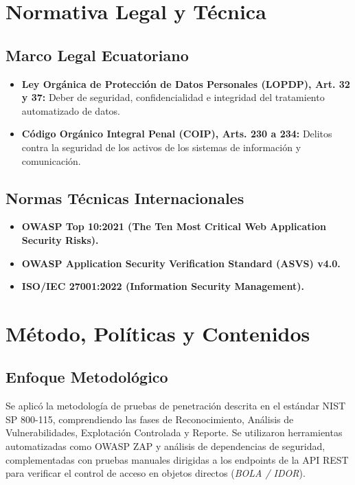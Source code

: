 \documentclass[12pt,a4paper]{article}
\begin{document}
\section{Normativa Legal y Técnica}
\subsection{Marco Legal Ecuatoriano}
\begin{itemize}[leftmargin=1.5em, itemsep=2pt]
    \item \textbf{Ley Orgánica de Protección de Datos Personales (LOPDP), Art. 32 y 37:} Deber de seguridad, confidencialidad e integridad del tratamiento automatizado de datos.
    \item \textbf{Código Orgánico Integral Penal (COIP), Arts. 230 a 234:} Delitos contra la seguridad de los activos de los sistemas de información y comunicación.
\end{itemize}
\subsection{Normas Técnicas Internacionales}
\begin{itemize}[leftmargin=1.5em, itemsep=2pt]
    \item \textbf{OWASP Top 10:2021 (The Ten Most Critical Web Application Security Risks).}
    \item \textbf{OWASP Application Security Verification Standard (ASVS) v4.0.}
    \item \textbf{ISO/IEC 27001:2022 (Information Security Management).}
\end{itemize}

\section{Método, Políticas y Contenidos}
\subsection{Enfoque Metodológico}
Se aplicó la metodología de pruebas de penetración descrita en el estándar NIST SP 800-115, comprendiendo las fases de Reconocimiento, Análisis de Vulnerabilidades, Explotación Controlada y Reporte. Se utilizaron herramientas automatizadas como OWASP ZAP y análisis de dependencias de seguridad, complementadas con pruebas manuales dirigidas a los endpoints de la API REST para verificar el control de acceso en objetos directos (\textit{BOLA / IDOR}).
\end{document}
